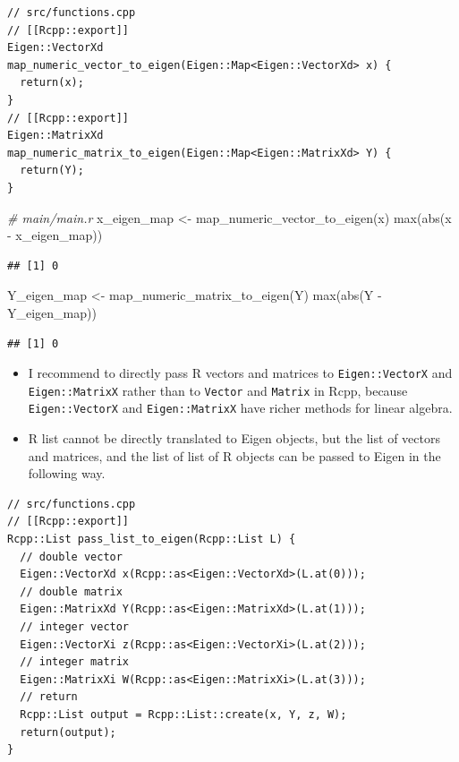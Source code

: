 \documentclass[
]{book}
\newenvironment{Shaded}{\begin{snugshade}}{\end{snugshade}}
\newcommand{\CommentTok}[1]{\textcolor[rgb]{0.56,0.35,0.01}{\textit{#1}}}
\newcommand{\FunctionTok}[1]{\textcolor[rgb]{0.00,0.00,0.00}{#1}}
\newcommand{\NormalTok}[1]{#1}
\newcommand{\OtherTok}[1]{\textcolor[rgb]{0.56,0.35,0.01}{#1}}
\newcommand{\SpecialCharTok}[1]{\textcolor[rgb]{0.00,0.00,0.00}{#1}}
\begin{document}
\begin{verbatim}
// src/functions.cpp
// [[Rcpp::export]]
Eigen::VectorXd map_numeric_vector_to_eigen(Eigen::Map<Eigen::VectorXd> x) {
  return(x);
}
// [[Rcpp::export]]
Eigen::MatrixXd map_numeric_matrix_to_eigen(Eigen::Map<Eigen::MatrixXd> Y) {
  return(Y);
}
\end{verbatim}

\begin{Shaded}
\begin{Highlighting}[]
\CommentTok{\# main/main.r}
\NormalTok{x\_eigen\_map }\OtherTok{\textless{}{-}} \FunctionTok{map\_numeric\_vector\_to\_eigen}\NormalTok{(x)}
\FunctionTok{max}\NormalTok{(}\FunctionTok{abs}\NormalTok{(x }\SpecialCharTok{{-}}\NormalTok{ x\_eigen\_map))}
\end{Highlighting}
\end{Shaded}

\begin{verbatim}
## [1] 0
\end{verbatim}

\begin{Shaded}
\begin{Highlighting}[]
\NormalTok{Y\_eigen\_map }\OtherTok{\textless{}{-}} \FunctionTok{map\_numeric\_matrix\_to\_eigen}\NormalTok{(Y)}
\FunctionTok{max}\NormalTok{(}\FunctionTok{abs}\NormalTok{(Y }\SpecialCharTok{{-}}\NormalTok{ Y\_eigen\_map))}
\end{Highlighting}
\end{Shaded}

\begin{verbatim}
## [1] 0
\end{verbatim}

\begin{itemize}
\item
  I recommend to directly pass R vectors and matrices to \texttt{Eigen::VectorX} and \texttt{Eigen::MatrixX} rather than to \texttt{Vector} and \texttt{Matrix} in Rcpp, because \texttt{Eigen::VectorX} and \texttt{Eigen::MatrixX} have richer methods for linear algebra.
\item
  R list cannot be directly translated to Eigen objects, but the list of vectors and matrices, and the list of list of R objects can be passed to Eigen in the following way.
\end{itemize}

\begin{verbatim}
// src/functions.cpp
// [[Rcpp::export]]
Rcpp::List pass_list_to_eigen(Rcpp::List L) {
  // double vector
  Eigen::VectorXd x(Rcpp::as<Eigen::VectorXd>(L.at(0)));
  // double matrix
  Eigen::MatrixXd Y(Rcpp::as<Eigen::MatrixXd>(L.at(1)));
  // integer vector
  Eigen::VectorXi z(Rcpp::as<Eigen::VectorXi>(L.at(2)));
  // integer matrix
  Eigen::MatrixXi W(Rcpp::as<Eigen::MatrixXi>(L.at(3)));
  // return
  Rcpp::List output = Rcpp::List::create(x, Y, z, W);
  return(output);
}
\end{verbatim}
\end{document}
